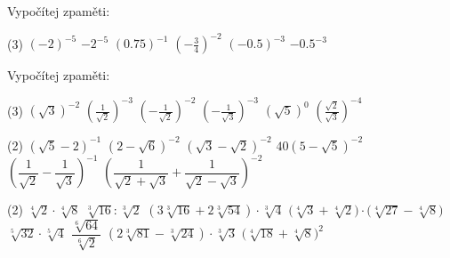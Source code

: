 \documentclass[12pt,a4paper]{article}
\begin{document}
\begin{exercise}
    Vypočítej zpaměti:
    \begin{tasks}(3)
        \task $(-2)^{-5}$
        \task $-2^{-5}$
        \task $(0.75)^{-1}$
        \task $\left(-\tfrac{3}{4}\right)^{-2}$
        \task $(-0.5)^{-3}$
        \task $-0.5^{-3}$
    \end{tasks}
\end{exercise}


\setcounter{section}{6}
\begin{exercise}
    Vypočítej zpaměti:
    \begin{tasks}(3)
        \task $(\sqrt{3})^{-2}$
        \task $\left(\tfrac{1}{\sqrt{2}}\right)^{-3}$
        \task $\left(-\tfrac{1}{\sqrt{2}}\right)^{-2}$
        \task $\left(-\tfrac{1}{\sqrt{3}}\right)^{-3}$
        \task $(\sqrt{5})^{0}$
        \task $\left(\tfrac{\sqrt{2}}{\sqrt{3}}\right)^{-4}$
    \end{tasks}
\end{exercise}

\newpage
\begin{exercise}
    \begin{tasks}(2)
        \task $\left(\sqrt{5} - 2\right)^{-1}$
        \task $\left(2 - \sqrt{6}\right)^{-2}$
        \task $\left(\sqrt{3} - \sqrt{2}\right)^{-2}$
        \task $40\left(5 - \sqrt{5}\right)^{-2}$
        \task $\left(\dfrac{1}{\sqrt{2}} - \dfrac{1}{\sqrt{3}}\right)^{-1}$  %
        \task $\left(\dfrac{1}{\sqrt{2}+\sqrt{3}} + \dfrac{1}{\sqrt{2}-\sqrt{3}}\right)^{-2}$ %
    \end{tasks}
\end{exercise}



\begin{exercise}[Vypočítejte]
    \begin{tasks}(2)
        \task $\sqrt[4]{2}\cdot \sqrt[4]{8}$
        \task $\sqrt[3]{16}:\sqrt[3]{2}$        
        \task $(3\sqrt[3]{16}+2\sqrt[3]{54})\cdot \sqrt[3]{4}$
        \task $\bigl(\sqrt[4]{3}+\sqrt[4]{2}\bigr)\cdot \bigl(\sqrt[4]{27}-\sqrt[4]{8}\bigr)$
        \task $\sqrt[5]{32}\cdot \sqrt[5]{4}$
        \task $\dfrac{\sqrt[6]{64}}{\sqrt[6]{2}}$
        \task $(2\sqrt[3]{81}-\sqrt[3]{24})\cdot \sqrt[3]{3}$
        \task $\bigl(\sqrt[4]{18}+\sqrt[4]{8}\bigr)^{2}$
    \end{tasks}
\end{exercise}
\end{document}
